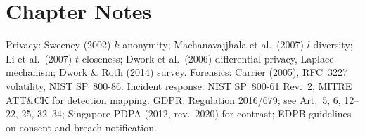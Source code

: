 \section*{Chapter Notes}
Privacy: Sweeney (2002) $k$-anonymity; Machanavajjhala et al.\ (2007) $l$-diversity; Li et al.\ (2007) $t$-closeness; Dwork et al.\ (2006) differential privacy, Laplace mechanism; Dwork \& Roth (2014) survey. Forensics: Carrier (2005), RFC~3227 volatility, NIST SP~800-86. Incident response: NIST SP~800-61 Rev.~2, MITRE ATT\&CK for detection mapping. GDPR: Regulation 2016/679; see Art.~5, 6, 12--22, 25, 32--34; Singapore PDPA (2012, rev.\ 2020) for contrast; EDPB guidelines on consent and breach notification.
